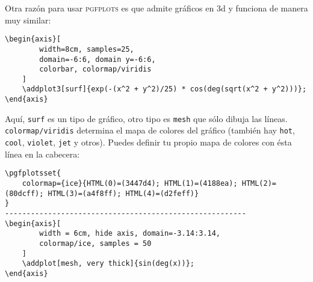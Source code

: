 \documentclass[intro-breve-latex.tex]{subfiles}
\begin{document}
\begin{figure}[!h]
	\centering
\end{figure}

Otra razón para usar \textsc{pgfplots} es que admite gráficos en 3d y funciona de manera muy similar:
\begin{lstlisting}
\begin{axis}[
		width=8cm, samples=25,
		domain=-6:6, domain y=-6:6,
		colorbar, colormap/viridis
	]
	\addplot3[surf]{exp(-(x^2 + y^2)/25) * cos(deg(sqrt(x^2 + y^2)))};
\end{axis}
\end{lstlisting}
\begin{figure}[!h]
	\centering
\end{figure}

Aquí, \texttt{surf} es un tipo de gráfico, otro tipo es \texttt{mesh} que sólo dibuja las líneas. \texttt{colormap/viridis} determina el mapa de colores del gráfico (también hay \texttt{hot}, \texttt{cool}, \texttt{violet}, \texttt{jet} y otros). Puedes definir tu propio mapa de colores con ésta línea en la cabecera:
\begin{lstlisting}
\pgfplotsset{
	colormap={ice}{HTML(0)=(3447d4); HTML(1)=(4188ea); HTML(2)=(80dcff); HTML(3)=(a4f8ff); HTML(4)=(d2feff)}
}
--------------------------------------------------------
\begin{axis}[
		width = 6cm, hide axis, domain=-3.14:3.14,
		colormap/ice, samples = 50
	]
	\addplot[mesh, very thick]{sin(deg(x))};
\end{axis}
\end{lstlisting}
\begin{figure}[!h]
	\centering
\end{figure}
\end{document}
